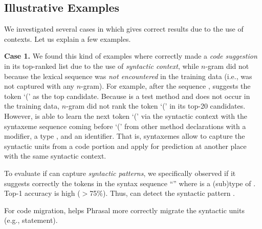 \subsection{Illustrative Examples}
\label{cases}




We investigated several cases in which {\tool}
gives correct results due to the use of contexts. Let us
explain a few examples.


\vspace{0.03in}
\noindent 
{\bf Case 1.} We found this kind of examples where {\tool} correctly
made a {\em code suggestion} in its top-ranked list due to the use of
{\em syntactic context}, while $n$-gram did not because the lexical
sequence was {\em not encountered} in the training data (i.e., was not
captured with any $n$-gram).
%
For example, after the sequence , {\tool} suggests the token `(' as the top
candidate. Because  is a
test method and does not occur in the training data, $n$-gram did not
rank the token `(' in its top-20 candidates.  However, {\tool} is able
to learn the next token `(' via the syntactic context with the
syntaxeme sequence  coming before `(' from
other method declarations with a modifier, a type , and an
identifier. That is, syntaxemes allow {\tool} to capture the syntactic
units from a code portion and apply for prediction at another place
with the same syntactic context. 

To evaluate if {\tool} can capture {\em syntactic patterns}, we
specifically observed if it suggests correctly the tokens in the
syntax sequence ``'' where
 is a (sub)type of . Top-1 accuracy
is high ($>$75\%). Thus, {\tool} can detect the syntactic pattern
.

For code migration, {\tool} helps Phrasal more correctly migrate the
syntactic units (e.g.,  statement).


